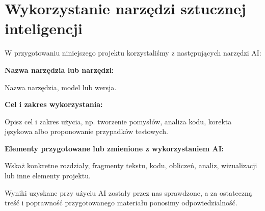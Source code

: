 %
%

\chapter{Wykorzystanie narzędzi sztucznej inteligencji}
\label{chap:wykorzystanie-ai}


W przygotowaniu niniejszego projektu korzystaliśmy z następujących narzędzi AI:

\noindent\textbf{Nazwa narzędzia lub narzędzi:}\par
Nazwa narzędzia, model lub wersja.

\medskip
\noindent\textbf{Cel i zakres wykorzystania:}\par
Opisz cel i zakres użycia, np. tworzenie pomysłów, analiza kodu, korekta
językowa albo proponowanie przypadków testowych.

\medskip
\noindent\textbf{Elementy przygotowane lub zmienione z wykorzystaniem AI:}\par
Wskaż konkretne rozdziały, fragmenty tekstu, kodu, obliczeń, analiz,
wizualizacji lub inne elementy projektu.

Wyniki uzyskane przy użyciu AI zostały przez nas sprawdzone, a za ostateczną
treść i poprawność przygotowanego materiału ponosimy odpowiedzialność.

